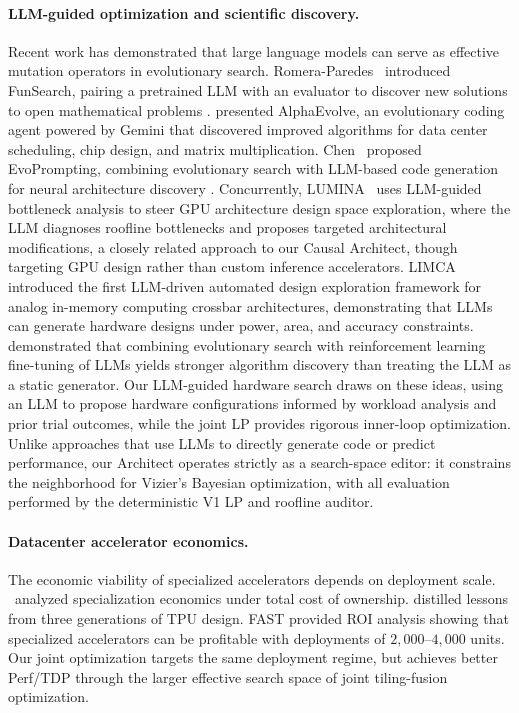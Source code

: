 \paragraph{LLM-guided optimization and scientific discovery.}
Recent work has demonstrated that large language models can serve as effective mutation operators in evolutionary search.
Romera-Paredes \etal~introduced FunSearch, pairing a pretrained LLM with an evaluator to discover new solutions to open mathematical problems \citep{romera2024mathematical}.
\citep{novikov2025alphaevolvecodingagentscientific} presented AlphaEvolve, an evolutionary coding agent powered by Gemini that discovered improved algorithms for data center scheduling, chip design, and matrix multiplication.
Chen \etal~proposed EvoPrompting, combining evolutionary search with LLM-based code generation for neural architecture discovery \citep{chen2023evopromptinglanguagemodelscodelevel}. Concurrently, LUMINA~\citep{zhang2026luminallmguidedgpuarchitecture} uses LLM-guided bottleneck analysis to steer GPU architecture design space exploration, where the LLM diagnoses roofline bottlenecks and proposes targeted architectural modifications, a closely related approach to our Causal Architect, though targeting GPU design rather than custom inference accelerators.  LIMCA \citep{vungarala2025limcallmautomatinganalog} introduced the first LLM-driven automated design exploration framework for analog in-memory computing crossbar architectures, demonstrating that LLMs can generate hardware designs under power, area, and accuracy constraints. 
\citep{surina2025algorithmdiscoveryllmsevolutionary} demonstrated that combining evolutionary search with reinforcement learning fine-tuning of LLMs yields stronger algorithm discovery than treating the LLM as a static generator. 
Our LLM-guided hardware search draws on these ideas, using an LLM to propose hardware configurations informed by workload analysis and prior trial outcomes, while the joint LP provides rigorous inner-loop optimization. Unlike approaches that use LLMs to directly generate code or predict performance, our Architect operates strictly as a search-space editor: it constrains the neighborhood for Vizier's Bayesian optimization, with all evaluation performed by the deterministic V1 LP and roofline auditor.

\paragraph{Datacenter accelerator economics.}
The economic viability of specialized accelerators depends on deployment scale.
\citep{magaki2016asic,xie2018extreme}~analyzed specialization economics under total cost of ownership.
\citep{jouppi2021ten} distilled lessons from three generations of TPU design.
FAST provided ROI analysis showing that specialized accelerators can be profitable with deployments of $2,000$--$4,000$ units.
Our joint optimization targets the same deployment regime, but achieves better Perf/TDP through the larger effective search space of joint tiling-fusion optimization.